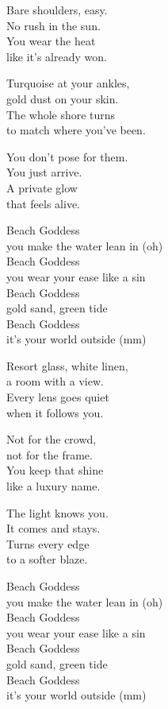 \begin{lyrics}
Bare shoulders, easy.\\
No rush in the sun.\\
You wear the heat\\
like it’s already won.

Turquoise at your ankles,\\
gold dust on your skin.\\
The whole shore turns\\
to match where you’ve been.

You don’t pose for them.\\
You just arrive.\\
A private glow\\
that feels alive.

Beach Goddess\\
you make the water lean in (oh)\\
Beach Goddess\\
you wear your ease like a sin\\
Beach Goddess\\
gold sand, green tide\\
Beach Goddess\\
it’s your world outside (mm)

Resort glass, white linen,\\
a room with a view.\\
Every lens goes quiet\\
when it follows you.

Not for the crowd,\\
not for the frame.\\
You keep that shine\\
like a luxury name.

The light knows you.\\
It comes and stays.\\
Turns every edge\\
to a softer blaze.

Beach Goddess\\
you make the water lean in (oh)\\
Beach Goddess\\
you wear your ease like a sin\\
Beach Goddess\\
gold sand, green tide\\
Beach Goddess\\
it’s your world outside (mm)


\end{lyrics}
